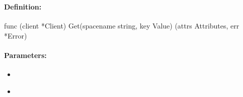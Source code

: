%
%
%


\pagebreak
\subsubsection{}
\label{api:Go:Get}


\paragraph{Definition:}
\begin{gocode}
func (client *Client) Get(spacename string, key Value) (attrs Attributes, err *Error)
\end{gocode}

\paragraph{Parameters:}
\begin{itemize}[noitemsep]
\item {}\\

\item {}\\

\end{itemize}

